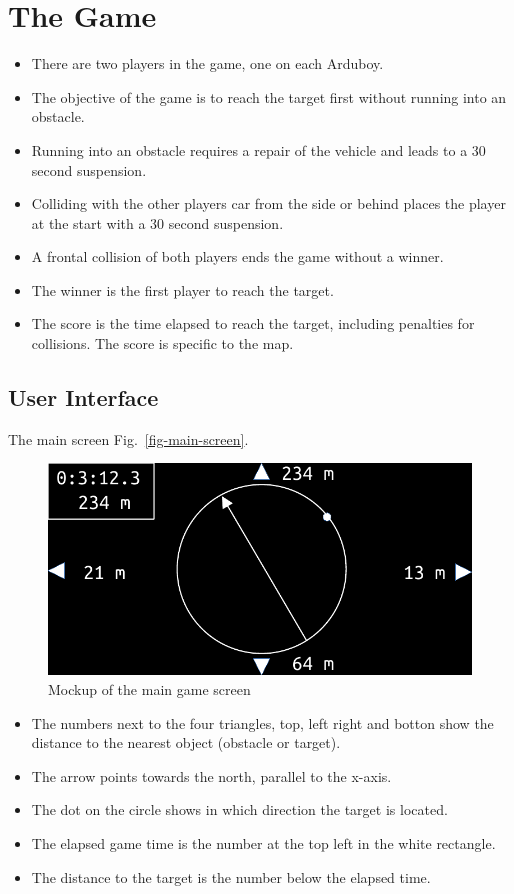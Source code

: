 \documentclass[11pt]{article}
\newcommand{\figref}[1]{Fig.~\eqref{#1}}
\begin{document}
\section{The Game}
\label{sec-the-game}
\begin{itemize}
    \item There are two players in the game, one on each Arduboy.
    \item The objective of the game is to reach the target first without
        running into an obstacle.
    \item Running into an obstacle requires a repair of the vehicle and leads
        to a 30 second suspension.
    \item Colliding with the other players car from the side or behind places
        the player at the start with a 30 second suspension.
    \item A frontal collision of both players ends the game without a winner.
    \item The winner is the first player to reach the target.
    \item The score is the time elapsed to reach the target, including
        penalties for collisions. The score is specific to the map.
\end{itemize}

\subsection{User Interface}
\label{sec-user-interface}
The main screen \figref{fig-main-screen}.
\begin{figure}
    \includegraphics[width=\textwidth]{odg/screen.pdf}
\caption{Mockup of the main game screen}\label{fig-main-screen}
\end{figure}
\begin{itemize}
    \item The numbers next to the four triangles, top, left right and botton
        show the distance to the nearest object (obstacle or target).
    \item The arrow points towards the north, parallel to the x-axis.
    \item The dot on the circle shows in which direction the target is
        located.
    \item The elapsed game time is the number at the top left in the white
        rectangle.
    \item The distance to the target is the number below the elapsed time.
\end{itemize}
\end{document}
